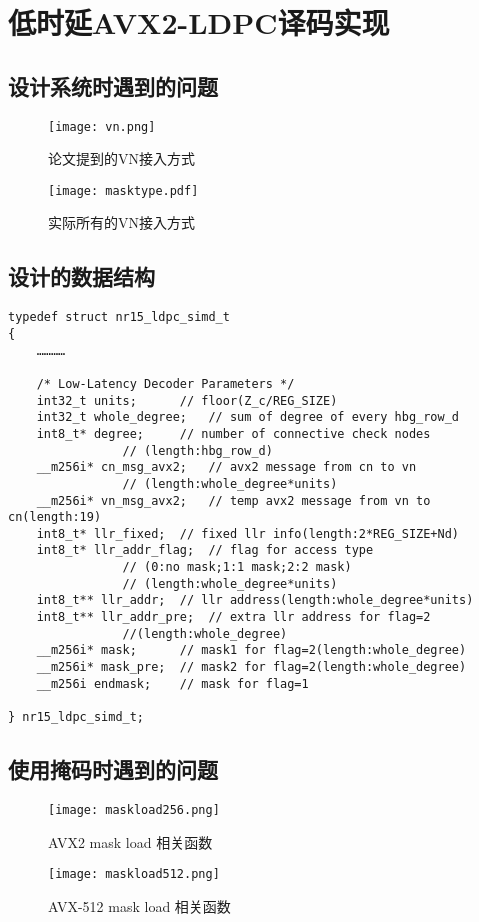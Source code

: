 \documentclass{article}
\begin{document}
\section{低时延AVX2-LDPC译码实现}
\subsection{设计系统时遇到的问题}
\begin{figure}[H]
	\centering
	\texttt{[image: vn.png]}
	\caption{论文提到的VN接入方式}
\end{figure}
\begin{figure}[H]
	\centering
	\texttt{[image: masktype.pdf]}
	\caption{实际所有的VN接入方式}
\end{figure}
\subsection{设计的数据结构}
\lstset{language=C++}
\begin{lstlisting}
typedef struct nr15_ldpc_simd_t
{
	…………

	/* Low-Latency Decoder Parameters */
	int32_t units;		// floor(Z_c/REG_SIZE)
	int32_t whole_degree;	// sum of degree of every hbg_row_d
	int8_t* degree;		// number of connective check nodes
				// (length:hbg_row_d)
	__m256i* cn_msg_avx2;	// avx2 message from cn to vn
				// (length:whole_degree*units)
	__m256i* vn_msg_avx2;	// temp avx2 message from vn to cn(length:19)
	int8_t* llr_fixed;	// fixed llr info(length:2*REG_SIZE+Nd)
	int8_t* llr_addr_flag;	// flag for access type
				// (0:no mask;1:1 mask;2:2 mask)
				// (length:whole_degree*units)
	int8_t** llr_addr;	// llr address(length:whole_degree*units)
	int8_t** llr_addr_pre;	// extra llr address for flag=2
				//(length:whole_degree)
	__m256i* mask;		// mask1 for flag=2(length:whole_degree)
	__m256i* mask_pre;	// mask2 for flag=2(length:whole_degree)
	__m256i endmask;	// mask for flag=1

} nr15_ldpc_simd_t;
\end{lstlisting}
\subsection{使用掩码时遇到的问题}
\begin{figure}[H]
	\centering
	\texttt{[image: maskload256.png]}
	\caption{AVX2 mask load 相关函数}
\end{figure}
\begin{figure}[H]
	\centering
	\texttt{[image: maskload512.png]}
	\caption{AVX-512 mask load 相关函数}
\end{figure}
\end{document}
